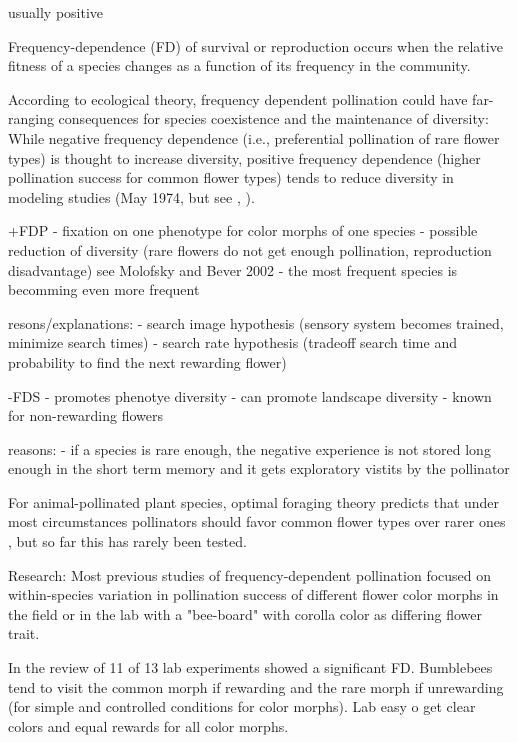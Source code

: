 \begin{itemize}
usually positive



Frequency-dependence (FD) of survival or reproduction occurs when the relative fitness of a species changes as a function of its frequency in the community. 

According to ecological theory, frequency dependent pollination could have far-ranging consequences for species coexistence and the maintenance of diversity: While negative frequency dependence (i.e., preferential pollination of rare flower types) is thought to increase diversity, positive frequency dependence (higher pollination success for common flower types) tends to reduce diversity in modeling studies (May 1974, but see \citealt{bever1999dynamics}, \citealt{molofsky2002novel}).

 +FDP
- fixation on one phenotype for color morphs of one species
- possible reduction of diversity (rare flowers do not get enough pollination, reproduction disadvantage) see Molofsky and Bever 2002
- the most frequent species is becomming even more frequent

resons/explanations:
 - search image hypothesis (sensory system becomes trained, minimize search times)
 - search rate hypothesis (tradeoff search time and probability to find the next rewarding flower)
 
 -FDS
 - promotes phenotye diversity
 - can promote landscape diversity
 - known for non-rewarding flowers
 
 reasons:
 - if a species is rare enough, the negative experience is not stored long enough in the short term memory and it gets exploratory vistits by the pollinator


For animal-pollinated plant species, optimal foraging theory predicts that under most circumstances pollinators should favor common flower types over rarer ones \citep{kunin1996pollinator} , but so far this has rarely been tested. 


Research:
Most previous studies of frequency-dependent pollination focused on within-species variation in pollination success of different flower color morphs in the field or in the lab with a "bee-board" with corolla color as differing flower trait. 

In the review of \citealt{smithson2001pollinator} 11 of 13 lab experiments showed a significant FD. Bumblebees tend to visit the common morph if rewarding and the rare morph if unrewarding (for simple and controlled conditions for color morphs). Lab easy o get clear colors and equal rewards for all color morphs.


\end{itemize}

